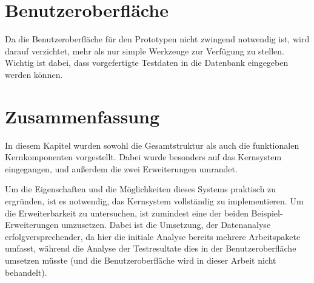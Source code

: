 \section{Benutzeroberfläche}
\label{sec:design:ui}

Da die Benutzeroberfläche für den Prototypen nicht zwingend notwendig ist,
wird darauf verzichtet, mehr als nur simple Werkzeuge zur Verfügung zu stellen.
Wichtig ist dabei, dass vorgefertigte Testdaten in die Datenbank eingegeben werden können.


\section{Zusammenfassung}
\label{sec:design:zusammenfassung}

In diesem Kapitel wurden sowohl die Gesamtstruktur als auch die funktionalen Kernkomponenten vorgestellt.
Dabei wurde besonders auf das Kernsystem eingegangen,
und außerdem die zwei Erweiterungen umrandet.

Um die Eigenschaften und die Möglichkeiten dieses Systems praktisch zu ergründen, ist es notwendig, das Kernsystem vollständig zu implementieren.
Um die Erweiterbarkeit zu untersuchen, ist zumindest eine der beiden Beispiel-Erweiterungen umzusetzen. Dabei ist die Umsetzung,
der Datenanalyse erfolgversprechender, da hier die initiale Analyse bereits mehrere Arbeitspakete umfasst, während die Analyse der Testresultate dies in der Benutzeroberfläche umsetzen müsste (und die Benutzeroberfläche wird in dieser Arbeit nicht behandelt).

